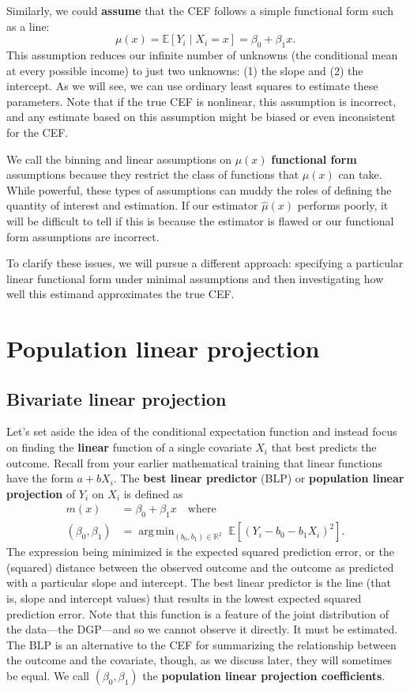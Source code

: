 \documentclass[
  13pt,
  letterpaper,
  DIV=11,
  numbers=noendperiod]{scrreprt}
\newcommand{\E}{\mathbb{E}}
\newcommand{\real}{\mathbb{R}}
\DeclareMathOperator*{\argmin}{arg\,min}
\theoremstyle{plain}
\theoremstyle{plain}
\theoremstyle{definition}
\theoremstyle{definition}
\theoremstyle{remark}
\begin{document}
Similarly, we could \textbf{assume} that the CEF follows a simple
functional form such as a line: \[ 
\mu(x) = \E[Y_{i}\mid X_{i} = x] = \beta_{0} + \beta_{1} x.
\] This assumption reduces our infinite number of unknowns (the
conditional mean at every possible income) to just two unknowns: (1) the
slope and (2) the intercept. As we will see, we can use ordinary least
squares to estimate these parameters. Note that if the true CEF is
nonlinear, this assumption is incorrect, and any estimate based on this
assumption might be biased or even inconsistent for the CEF.

We call the binning and linear assumptions on \(\mu(x)\)
\textbf{functional form} assumptions because they restrict the class of
functions that \(\mu(x)\) can take. While powerful, these types of
assumptions can muddy the roles of defining the quantity of interest and
estimation. If our estimator \(\widehat{\mu}(x)\) performs poorly, it
will be difficult to tell if this is because the estimator is flawed or
our functional form assumptions are incorrect.

To clarify these issues, we will pursue a different approach: specifying
a particular linear functional form under minimal assumptions and then
investigating how well this estimand approximates the true CEF.

\section{Population linear projection}\label{sec-linear-projection}

\subsection{Bivariate linear
projection}\label{bivariate-linear-projection}

Let's set aside the idea of the conditional expectation function and
instead focus on finding the \textbf{linear} function of a single
covariate \(X_i\) that best predicts the outcome. Recall from your
earlier mathematical training that linear functions have the form
\(a + bX_i\). The \textbf{best linear predictor} (BLP) or
\textbf{population linear projection} of \(Y_i\) on \(X_i\) is defined
as \[ 
\begin{aligned}
m(x) &= \beta_0 + \beta_1 x \quad\text{where} \\ (\beta_{0}, \beta_{1}) &= \argmin_{(b_{0}, b_{1}) \in \real^{2}}\; \E[(Y_{i} - b_{0} - b_{1}X_{i} )^{2}].
\end{aligned}
\] The expression being minimized is the expected squared prediction
error, or the (squared) distance between the observed outcome and the
outcome as predicted with a particular slope and intercept. The best
linear predictor is the line (that is, slope and intercept values) that
results in the lowest expected squared prediction error. Note that this
function is a feature of the joint distribution of the data---the
DGP---and so we cannot observe it directly. It must be estimated. The
BLP is an alternative to the CEF for summarizing the relationship
between the outcome and the covariate, though, as we discuss later, they
will sometimes be equal. We call \((\beta_{0}, \beta_{1})\) the
\textbf{population linear projection coefficients}.
\end{document}
